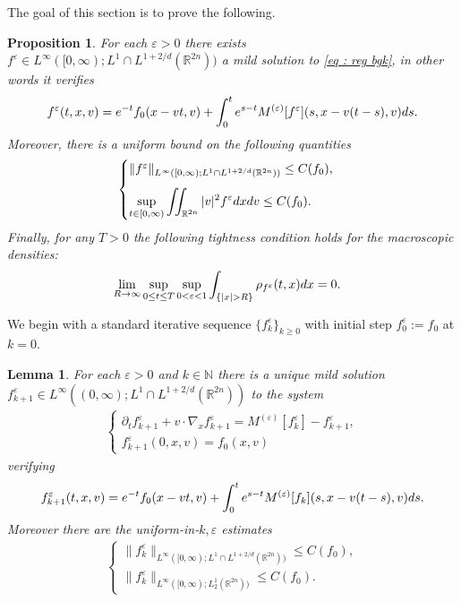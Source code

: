 \documentclass{amsart}
\theoremstyle{plain}
\newtheorem{lemma}[theorem]{Lemma}
\newtheorem{proposition}[theorem]{Proposition}
\theoremstyle{remark}
\numberwithin{equation}{section}
\newcommand{\bbN}{\mathbb N}
\newcommand{\p}{\partial}
\newcommand{\R}{\mathbb{R}}
\newcommand{\ve}{\varepsilon}
\newcommand{\dx}{\textnormal{d}x}
\newcommand{\dv}{\textnormal{d}v}
\newcommand{\ds}{\textnormal{d}s}
\begin{document}
The goal of this section is to prove the following.
\begin{proposition}
\label{prop : reg bgk}
    For each $\ve>0$ there exists $f^\ve\in L^\infty([0,\infty);L^1\cap L^{1+2/d}(\R^{2n}))$ a mild solution to \eqref{eq : reg bgk}, in other words it verifies
    \begin{align}\label{eq: mild form ve}
        f^\ve(t,x,v) = e^{-t} f_0(x-vt,v) + \int_0^t e^{s-t} M^{(\ve)}[f^\ve](s,x-v(t-s),v) \ds. 
    \end{align}
    Moreover, there is a uniform bound on the following quantities
        \begin{equation}
        \label{eq : reg bgk unif bdd}
        \begin{cases}
        \|f^\ve\|_{L^\infty([0,\infty);L^1 \cap L^{1+2/d}(\R^{2n}))} \le C(f_0),\\[8pt]
        \displaystyle \sup_{t \in [0,\infty)} \iint_{\R^{2n}} |v|^2 f^\ve \dx \dv \le C(f_0).
        \end{cases}
    \end{equation}
    Finally, for any $T>0$ the following tightness condition holds for the macroscopic densities:
    \begin{equation}
    \label{eq : tightness}
    \begin{split}
        &\lim_{R\to \infty} \sup_{0\le t \le T} \sup_{0<\ve<1} \int_{\{|x| > R\}} \rho_{f^\ve}(t,x) \dx = 0.
    \end{split}
    \end{equation}
\end{proposition}



We begin with a standard iterative sequence $\{f^\ve_k\}_{k\ge 0}$ with initial step $f^\ve_0:= f_0$ at $k=0$.
\begin{lemma}
\label{lem : iterative seq}
    For each $\ve >0$ and $k\in \bbN$ there is a unique mild solution $f^\ve_{k+1}\in L^\infty((0,\infty);L^1\cap L^{1+2/d}(\R^{2n}))$ to the system
    \begin{align} \label{eq: lin k}
    \begin{cases}
        \p_t f^\ve_{k+1} + v\cdot \nabla_x f^\ve_{k+1} = M^{(\ve)}[f_k^\ve] - f_{k+1}^\ve,\\
        f_{k+1}^\ve(0,x,v) = f_0(x,v)
    \end{cases}
    \end{align}
    verifying
    \begin{equation}
    \label{eq : k mild form}
    f_{k+1}^\ve(t,x,v) = e^{-t} f_0(x-vt,v) + \int_0^t e^{s-t} M^{(\ve)}[f_k](s,x-v(t-s),v) \ds.
\end{equation}
Moreover there are the uniform-in-$k,\ve$ estimates
\begin{align}
\label{eq : unif in k, ve}
\begin{cases}
    \|f^\ve_{k}\|_{L^\infty([0,\infty);L^1\cap L^{1+2/d}(\R^{2n}))} \le C(f_0),\\
    \|f^\ve_{k}\|_{L^\infty([0,\infty);L^{1}_2(\R^{2n}))} \le C(f_0).
\end{cases}
\end{align}
\end{lemma}
\end{document}

